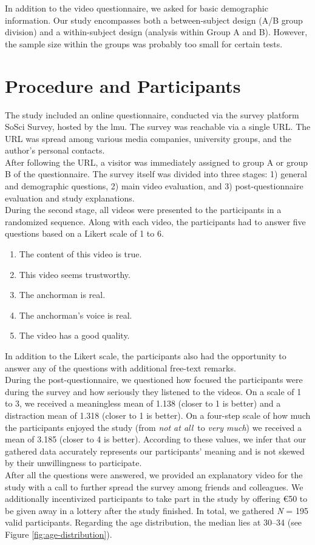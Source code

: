 \documentclass[
  a4paper,  %
  twoside,  %
  bibliography=totoc,
  headsepline,
  cleardoublepage=empty,
  parskip=half,
  draft=false
]{scrbook}
\begin{document}
In addition to the video questionnaire, we asked for basic demographic information. Our study encompasses both a between-subject design (A/B group division) and a within-subject design (analysis within Group A and B). However, the sample size within the groups was probably too small for certain tests.

\section{Procedure and Participants}
\label{sec:procedure-and-participants}

The study included an online questionnaire, conducted via the survey platform SoSci Survey, hosted by the \gls{lmu}. The survey was reachable via a single URL. The URL was spread among various media companies, university groups, and the author's personal contacts. \\
After following the URL, a visitor was immediately assigned to group A or group B of the questionnaire. The survey itself was divided into three stages: 1) general and demographic questions, 2) main video evaluation, and 3) post-questionnaire evaluation and study explanations. \\
During the second stage, all videos were presented to the participants in a randomized sequence. Along with each video, the participants had to answer five questions based on a Likert scale of 1 to 6.
\begin{enumerate}
  \item The content of this video is true.
  \item This video seems trustworthy.
  \item The anchorman is real.
  \item The anchorman's voice is real.
  \item The video has a good quality.
\end{enumerate}
In addition to the Likert scale, the participants also had the opportunity to answer any of the questions with additional free-text remarks. \\
During the post-questionnaire, we questioned how focused the participants were during the survey and how seriously they listened to the videos. On a scale of 1 to 3, we received a meaningless mean of 1.138 (closer to 1 is better) and a distraction mean of 1.318 (closer to 1 is better). On a four-step scale of how much the participants enjoyed the study (from \textit{not at all} to \textit{very much}) we received a mean of 3.185 (closer to 4 is better). According to these values, we infer that our gathered data accurately represents our participants' meaning and is not skewed by their unwillingness to participate. \\
After all the questions were answered, we provided an explanatory video for the study with a call to further spread the survey among friends and colleagues. We additionally incentivized participants to take part in the study by offering €50 to be given away in a lottery after the study finished.
In total, we gathered \textit{N} = 195 valid participants. Regarding the age distribution, the median lies at 30–34 (see Figure \ref{fig:age-distribution}).
\end{document}
